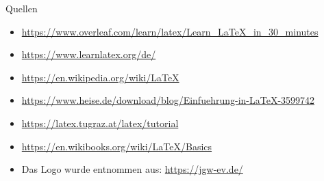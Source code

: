 
\begin{frame}{Quellen}

	\scriptsize

	\begin{itemize}
		\item \url{https://www.overleaf.com/learn/latex/Learn_LaTeX_in_30_minutes}
		\item \url{https://www.learnlatex.org/de/}
		\item \url{https://en.wikipedia.org/wiki/LaTeX}
		\item \url{https://www.heise.de/download/blog/Einfuehrung-in-LaTeX-3599742}
		\item \url{https://latex.tugraz.at/latex/tutorial}
		\item \url{https://en.wikibooks.org/wiki/LaTeX/Basics}
		\item Das Logo wurde entnommen aus: \url{https://jgw-ev.de/}
	\end{itemize}

\end{frame}
